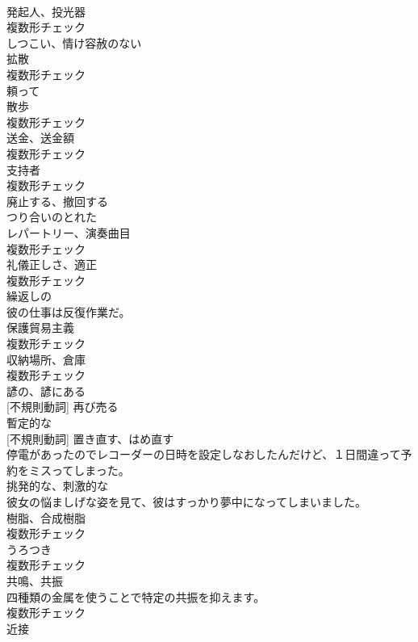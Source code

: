 \documentclass[8pt]{extreport}
\begin{document}
\begin{CJK}{UTF8}{min}
\\	[名詞]	発起人、投光器	
\\	複数形チェック
\\	[形容詞]	しつこい、情け容赦のない	
\\	[名詞]	拡散	
\\	複数形チェック
\\	[形容詞]	頼って	
\\	[名詞]	散歩	
\\	複数形チェック
\\	[名詞]	送金、送金額	
\\	複数形チェック
\\	[名詞]	支持者	
\\	複数形チェック
\\	[動詞]	廃止する、撤回する	
\\	[形容詞]	つり合いのとれた	
\\	[名詞]	レパートリー、演奏曲目	
\\	複数形チェック
\\	[名詞]	礼儀正しさ、適正	
\\	複数形チェック
\\	[形容詞]	繰返しの	
\\	彼の仕事は反復作業だ。	
\\	[名詞]	保護貿易主義	
\\	複数形チェック
\\	[名詞]	収納場所、倉庫	
\\	複数形チェック
\\	[形容詞]	諺の、諺にある	
\\	[動詞] [不規則動詞]	再び売る	
\\	[形容詞]	暫定的な	
\\	[動詞] [不規則動詞]	置き直す、はめ直す	
\\	停電があったのでレコーダーの日時を設定しなおしたんだけど、１日間違って予約をミスってしまった。	
\\	[形容詞]	挑発的な、刺激的な	
\\	彼女の悩ましげな姿を見て、彼はすっかり夢中になってしまいました。	
\\	[名詞]	樹脂、合成樹脂	
\\	複数形チェック
\\	[名詞]	うろつき	
\\	複数形チェック
\\	[名詞]	共鳴、共振	
\\	四種類の金属を使うことで特定の共振を抑えます。	
\\	複数形チェック
\\	[名詞]	近接	

\end{CJK}
\end{document}
